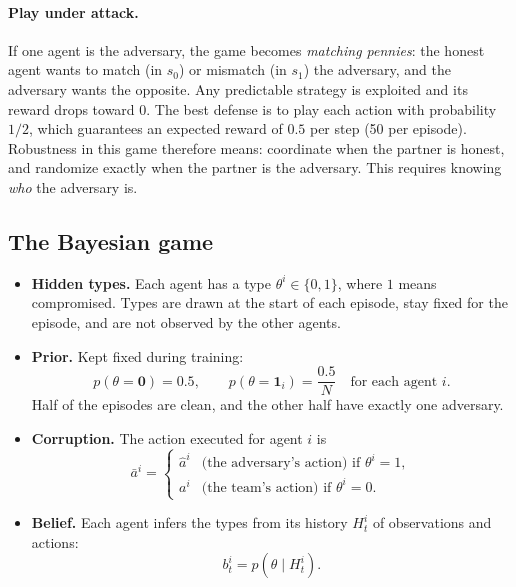 \documentclass[11pt]{article}
\begin{document}
\paragraph{Play under attack.} If one agent is the adversary, the game becomes
\emph{matching pennies}: the honest agent wants to match (in $s_0$) or mismatch (in $s_1$)
the adversary, and the adversary wants the opposite. Any predictable strategy is exploited
and its reward drops toward 0. The best defense is to play each action with probability
$1/2$, which guarantees an expected reward of $0.5$ per step (50 per episode).
Robustness in this game therefore means: coordinate when the partner is honest, and
randomize exactly when the partner is the adversary. This requires knowing \emph{who} the
adversary is.

\subsection{The Bayesian game}
\begin{itemize}
  \item \textbf{Hidden types.} Each agent has a type $\theta^i \in \{0,1\}$, where $1$ means
        compromised. Types are drawn at the start of each episode, stay fixed for the
        episode, and are not observed by the other agents.
  \item \textbf{Prior.} Kept fixed during training:
        \[
          p(\theta = \mathbf{0}) = 0.5, \qquad
          p(\theta = \mathbf{1}_i) = \frac{0.5}{N} \quad \text{for each agent } i.
        \]
        Half of the episodes are clean, and the other half have exactly one adversary.
  \item \textbf{Corruption.} The action executed for agent $i$ is
        \[
          \bar a^i =
          \begin{cases}
            \hat a^i & \text{(the adversary's action) if } \theta^i = 1,\\
            a^i & \text{(the team's action) if } \theta^i = 0.
          \end{cases}
        \]
  \item \textbf{Belief.} Each agent infers the types from its history
        $H^i_t$ of observations and actions:
        \[
          b^i_t = p(\theta \mid H^i_t).
        \]
\end{itemize}
\end{document}
